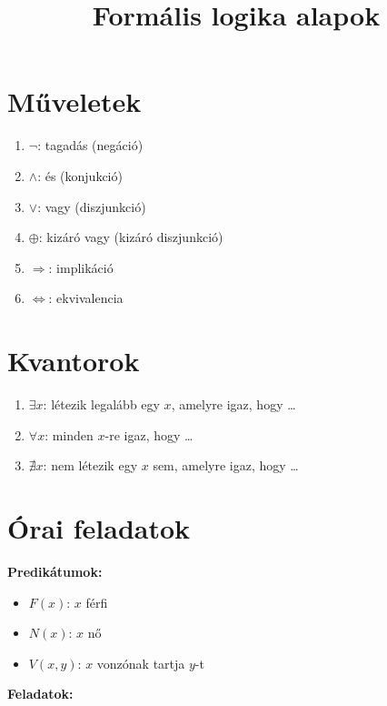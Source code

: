\documentclass[12pt]{article}
\title{Formális logika alapok}
\date{}
\begin{document}
\maketitle

\section{Műveletek}

\begin{enumerate}
    \item $\neg$: tagadás (negáció)
    \item $\land$: és (konjukció)
    \item $\lor$: vagy (diszjunkció)
    \item $\oplus$: kizáró vagy (kizáró diszjunkció)
    \item $\Rightarrow$: implikáció
    \item $\Leftrightarrow$: ekvivalencia
\end{enumerate}

\section{Kvantorok}

\begin{enumerate}
    \item $\exists x$: létezik legalább egy $x$, amelyre igaz, hogy \dots
    \item $\forall x$: minden $x$-re igaz, hogy \dots
    \item $\nexists x$: nem létezik egy $x$ sem, amelyre igaz, hogy \dots
\end{enumerate}

\newpage
\section{Órai feladatok}

\noindent\textbf{Predikátumok:}

\begin{itemize}
    \item $F(x)$: $x$ férfi
    \item $N(x)$: $x$ nő
    \item $V(x, y)$: $x$ vonzónak tartja $y$-t
\end{itemize}

\noindent\textbf{Feladatok:}
\end{document}
